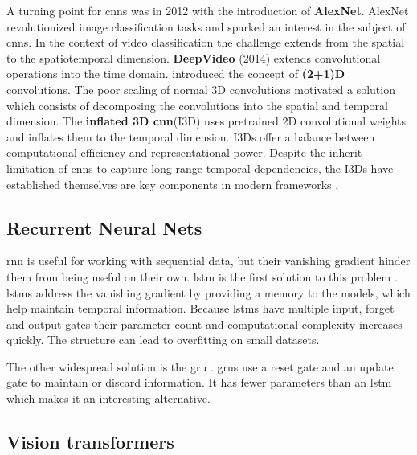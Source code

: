 A turning point for \acrshort{cnn}s was in 2012 with the introduction of \textbf{AlexNet}\cite{krizhevsky_alexnet}. AlexNet revolutionized image classification tasks and sparked an interest in the subject of \acrshort{cnn}s. In the context of video classification the challenge extends from the spatial to the spatiotemporal dimension. \textbf{DeepVideo} \cite{karpathy_deep_video}(2014) extends convolutional operations into the time domain. \textcite{tran_2_plus_1_convolution} introduced the concept of \textbf{(2+1)D} convolutions. The poor scaling of normal 3D convolutions motivated a solution which consists of decomposing the convolutions into the spatial and temporal dimension. The \textbf{inflated 3D \acrlong{cnn}}(I3D)\cite{carreira_2017_i3d_quo_vadis} uses pretrained 2D convolutional weights and inflates them to the temporal dimension. I3Ds offer a balance between computational efficiency and representational power. Despite the inherit limitation of \acrshort{cnn}s to capture long-range temporal dependencies, the I3Ds have established themselves are key components in modern frameworks\cite{bhogal_human_2023} \cite{maheriya__2024_aerial_cnn}.


\subsection{Recurrent Neural Nets}

\acrfull{rnn} is useful for working with sequential data, but their vanishing gradient hinder them from being useful on their own. \acrfull{lstm} is the first solution to this problem \cite{bhogal_human_2023} \cite{kumar_human_2023} \cite{mahaseni_spotting_2021}. \acrshort{lstm}s address the vanishing gradient by providing a memory to the models, which help maintain temporal information. 
Because \acrshort{lstm}s have multiple input, forget and output gates their parameter count and computational complexity increases quickly. The structure can lead to overfitting on small datasets.  

The other widespread solution is the \acrfull{gru} \cite{giveki_human_2024} \cite{li_oarnet_2024} \cite{yu_i3d_2023}. \acrlong{gru}s use a reset gate and an update gate to maintain or discard information. It has fewer parameters than an \acrshort{lstm} which makes it an interesting alternative\cite{survey_of_survey}.

\subsection{Vision transformers}

